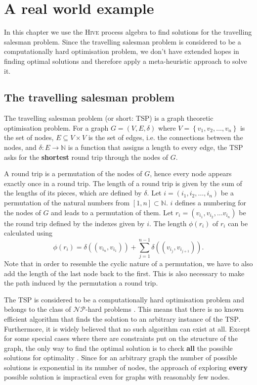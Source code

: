 \chapter{A real world example}
In this chapter we use the \textsc{Hive} process algebra to find solutions for the travelling salesman problem. Since the travelling salesman problem is considered to be a computationally hard optimisation problem, we don't have extended hopes in finding optimal solutions and therefore apply a meta-heuristic approach to solve it.

\section{The travelling salesman problem}
\label{chp:tsp}
The travelling salesman problem (or short: \textsc{TSP}) is a graph theoretic optimisation problem. For a graph $G = \left( V, E, \delta \right)$ where $V = \left\{ v_1, v_2, \ldots, v_n \right\}$ is the set of nodes, $E \subseteq V \times V$ is the set of edges, i.e. the connections between the nodes, and $\delta \colon E \to \mathbb{N}$ is a function that assigns a length to every edge, the \textsc{TSP} asks for the \textbf{shortest} round trip through the nodes of $G$.

A round trip is a permutation of the nodes of $G$, hence every node appears exactly once in a round trip. The length of a round trip is given by the sum of the lengths of its pieces, which are defined by $\delta$. Let $i = \left( i_1, i_2, \ldots, i_n \right)$ be a permutation of the natural numbers from $[1, n] \subset \mathbb{N}$. $i$ defines a numbering for the nodes of $G$ and leads to a permutation of them. Let $r_i = \left( v_{i_1}, v_{i_2}, \ldots v_{i_n} \right)$ be the round trip defined by the indexes given by $i$. The length $\phi \left( r_i \right)$ of $r_i$ can be calculated using
\begin{equation}
  \label{eqn:length_roundtrip}
  \phi \left( r_i \right) = \delta \left( \left( v_{i_n}, v_{i_1} \right) \right) + \sum_{j=1}^{n-1} \delta \left( \left( v_{i_j}, v_{i_{j+1}} \right) \right).
\end{equation}
Note that in order to resemble the cyclic nature of a permutation, we have to also add the length of the last node back to the first. This is also necessary to make the path induced by the permutation a round trip.

The \textsc{TSP} is considered to be a computationally hard optimisation problem and belongs to the class of $\mathcal{NP}$-hard problems \cite{Garey:1979:CIG:578533}. This means that there is no known efficient algorithm that finds the solution to an arbitrary instance of the \textsc{TSP}. Furthermore, it is widely believed that no such algorithm can exist at all. Except for some special cases where there are constraints put on the structure of the graph, the only way to find the optimal solution is to check \textbf{all} the possible solutions for optimality \cite{}. Since for an arbitrary graph the number of possible solutions is exponential in its number of nodes, the approach of exploring \textbf{every} possible solution is impractical even for graphs with reasonably few nodes.

